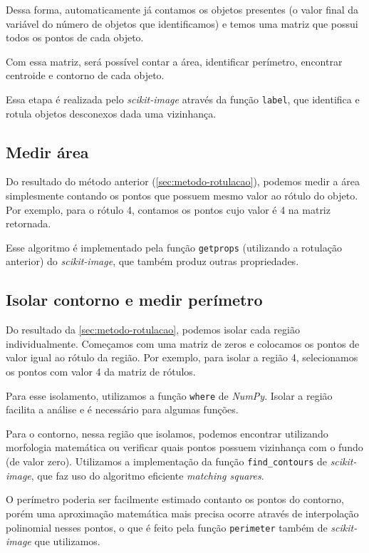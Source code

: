\documentclass[brazilian,a4paper,twocolumn]{article}
\begin{document}
        Dessa forma, automaticamente já contamos os objetos presentes (o valor final da variável do número de objetos que identificamos) e temos uma matriz que possui todos os pontos de cada objeto.

        Com essa matriz, será possível contar a área, identificar perímetro, encontrar centroide e contorno de cada objeto.

        Essa etapa é realizada pelo \emph{scikit-image} através da função \texttt{label}, que identifica e rotula objetos desconexos dada uma vizinhança.

    \subsection{Medir área}
    \label{sec:metodo-area}

        Do resultado do método anterior (\ref{sec:metodo-rotulacao}), podemos medir a área simplesmente contando os pontos que possuem mesmo valor ao rótulo do objeto. Por exemplo, para o rótulo 4, contamos os pontos cujo valor é 4 na matriz retornada.

        Esse algoritmo é implementado pela função \texttt{getprops} (utilizando a rotulação anterior) do \emph{scikit-image}, que também produz outras propriedades.

    \subsection{Isolar contorno e medir perímetro}

        Do resultado da \cref{sec:metodo-rotulacao}, podemos isolar cada região individualmente. Começamos com uma matriz de zeros e colocamos os pontos de valor igual ao rótulo da região. Por exemplo, para isolar a região 4, selecionamos os pontos com valor 4 da matriz de rótulos.

        Para esse isolamento, utilizamos a função \texttt{where} de \emph{NumPy}. Isolar a região facilita a análise e é necessário para algumas funções.

        Para o contorno, nessa região que isolamos, podemos encontrar utilizando morfologia matemática ou verificar quais pontos possuem vizinhança com o fundo (de valor zero). Utilizamos a implementação da função \texttt{find_contours} de \emph{scikit-image}, que faz uso do algoritmo eficiente \textit{matching squares}.

        O perímetro poderia ser facilmente estimado contanto os pontos do contorno, porém uma aproximação matemática mais precisa ocorre através de interpolação polinomial nesses pontos, o que é feito pela função \texttt{perimeter} também de \emph{scikit-image} que utilizamos.
\end{document}
